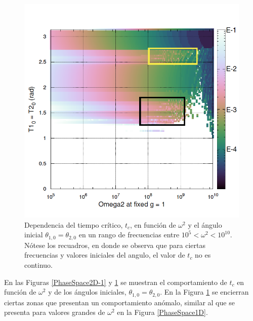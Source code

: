 \documentclass[10pt,letterpaper]{article}
\begin{document}
\begin{figure}
\centering
\includegraphics[scale=0.45]{2DPhaseSpace_2.png}
\caption{Dependencia del tiempo crítico, $t_c$, en función de $\omega^2$ y el ángulo inicial $\theta_{1,0} = \theta_{2,0}$ en un rango de frecuencias entre $10^5<\omega^2<10^{10}$. Nótese los recuadros, en donde se observa que para ciertas frecuencias y valores iniciales del angulo, el valor de $t_c$ no es continuo.}\label{PhaseSpace2D-2}
\end{figure}
En las Figuras \ref{PhaseSpace2D-1} y \ref{PhaseSpace2D-2} se muestran el comportamiento de $t_c$ en función de $\omega^2$ y de los ángulos iniciales, $\theta_{1,0} = \theta_{2,0}$. En la Figura \ref{PhaseSpace2D-2} se encierran ciertas zonas que presentan un comportamiento anómalo, similar al que se presenta para valores grandes de $\omega^2$ en la Figura \ref{PhaseSpace1D}.
\end{document}
